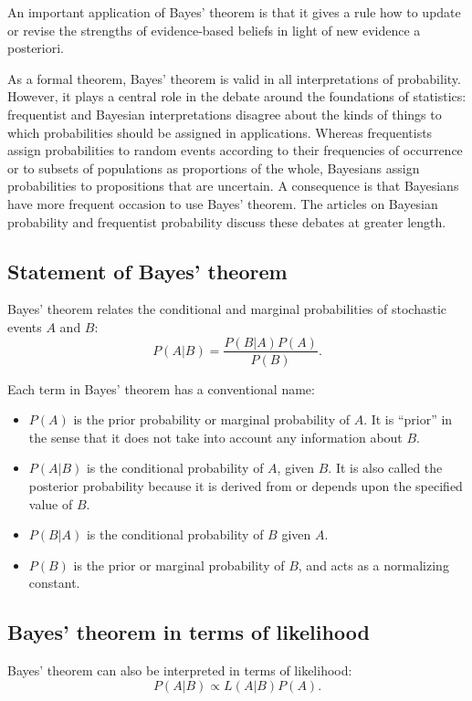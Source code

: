 An important application of Bayes' theorem is that it gives a rule how to
update or revise the strengths of evidence-based beliefs in light of new evidence
a posteriori.

As a formal theorem, Bayes' theorem is valid in all interpretations of probability. However, it plays a central role in the debate around the foundations of
statistics: frequentist and Bayesian interpretations disagree about the kinds of
things to which probabilities should be assigned in applications. Whereas frequentists assign probabilities to random events according to their frequencies of
occurrence or to subsets of populations as proportions of the whole, Bayesians
assign probabilities to propositions that are uncertain. A consequence is that
Bayesians have more frequent occasion to use Bayes' theorem. The articles on
Bayesian probability and frequentist probability discuss these debates at greater
length.


\subsection{Statement of Bayes' theorem}
Bayes' theorem relates the conditional and marginal probabilities of stochastic
events $A$ and $B$:
$$
P(A|B) = \frac{P (B|A) P (A)}{P (B)}.
$$

Each term in Bayes' theorem has a conventional name:
\begin{itemize}
\item $P(A)$ is the prior probability or marginal probability of $A$. It is ``prior'' in
the sense that it does not take into account any information about $B$.
\item $P(A|B)$ is the conditional probability of $A$, given $B$. It is also called the
posterior probability because it is derived from or depends upon the specified value of $B$.
\item $P(B|A)$ is the conditional probability of $B$ given $A$.
\item $P(B)$ is the prior or marginal probability of $B$, and acts as a normalizing
constant.
\end{itemize}

\subsection{Bayes' theorem in terms of likelihood}

Bayes' theorem can also be interpreted in terms of likelihood:
$$P(A|B) \propto L(A|B) P(A).$$

